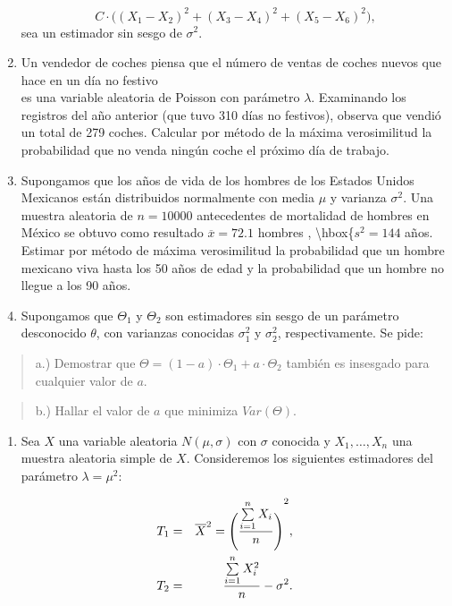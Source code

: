 \documentclass[]{article}
\providecommand{\tightlist}{%
  \setlength{\itemsep}{0pt}\setlength{\parskip}{0pt}}
\begin{document}
\begin{enumerate}
  \[C\cdot\bigl({(X_1 -X_2)}^2 +{(X_3 -X_4)}^2 + 
   {(X_5 -X_6)}^2\bigr),\] sea un estimador sin sesgo de \(\sigma^2\).
\item
  Un vendedor de coches piensa que el número de ventas de coches nuevos
  que hace en un día no festivo\\
  es una variable aleatoria de Poisson con parámetro \(\lambda\).
  Examinando los registros del año anterior (que tuvo 310 días no
  festivos), observa que vendió un total de 279 coches. Calcular por
  método de la máxima verosimilitud la probabilidad que no venda ningún
  coche el próximo día de trabajo.
\item
  Supongamos que los años de vida de los hombres de los Estados Unidos
  Mexicanos están distribuidos normalmente con media \(\mu\) y varianza
  \(\sigma^2\). Una muestra aleatoria de \(n=10000\) antecedentes de
  mortalidad de hombres en México se obtuvo como resultado
  \(\overline{x}=72.1\) hombres , \textbackslash{}hbox\{\(s^2 =144\)
  años. Estimar por método de máxima verosimilitud la probabilidad que
  un hombre mexicano viva hasta los 50 años de edad y la probabilidad
  que un hombre no llegue a los 90 años.
\item
  Supongamos que \(\Theta_1\) y \(\Theta_2\) son estimadores sin sesgo
  de un parámetro desconocido \(\theta\), con varianzas conocidas
  \(\sigma_1^2\) y \(\sigma_2^2\), respectivamente. Se pide:
\end{enumerate}

\begin{quote}
a.) Demostrar que \(\Theta =(1-a)\cdot\Theta_1 +a\cdot \Theta_2\)
también es insesgado para cualquier valor de \(a\).
\end{quote}

\begin{quote}
b.) Hallar el valor de \(a\) que minimiza \(Var(\Theta)\).
\end{quote}

\begin{enumerate}
\def\labelenumi{\arabic{enumi}.}
\setcounter{enumi}{13}
\tightlist
\item
  Sea \(X\) una variable aleatoria \(N(\mu,\sigma)\) con \(\sigma\)
  conocida y \(X_1,\ldots, X_n\) una muestra aleatoria simple de \(X\).
  Consideremos los siguientes estimadores del parámetro
  \(\lambda =\mu^2\):
\end{enumerate}

\begin{eqnarray*}
T_1 & = & \overline{X}^2 = {\Biggl({\sum\limits_{i=1}^n
X_i\over n}\Biggr)}^2,\\  T_2 & = & {\sum\limits_{i=1}^n X_i^2 \over
n}-\sigma^2.
\end{eqnarray*}
\end{document}
